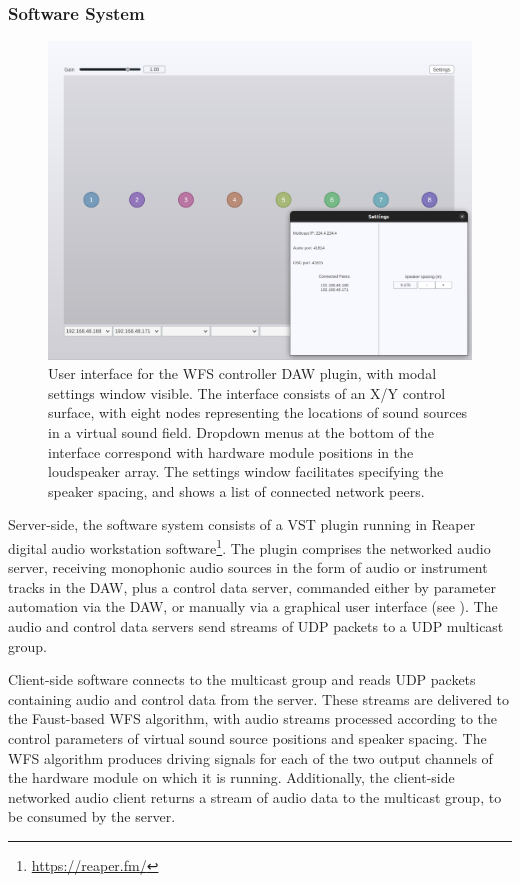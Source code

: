 \subsubsection{Software System}\label{subsubsec:software-system}

\begin{figure}[ht]
    \centering
    \includegraphics[width=\textwidth]{figures/plugin}
    \caption{
        User interface for the WFS controller DAW plugin, with modal
        settings window visible.
        The interface consists of an X/Y control surface, with eight nodes
        representing the locations of sound sources in a virtual sound field.
        Dropdown menus at the bottom of the interface correspond with hardware
        module positions in the loudspeaker array.
        The settings window facilitates specifying the speaker spacing, and
        shows a list of connected network peers.
    }
    \label{fig:plugin-interface}
\end{figure}

Server-side, the software system consists of a VST plugin running in Reaper
digital audio workstation software\footnote{\url{https://reaper.fm/}}.
The plugin comprises the networked audio server, receiving monophonic audio
sources in the form of audio or instrument tracks in the DAW, plus a control
data server, commanded either by parameter automation via the DAW, or manually
via a graphical user interface (see ).
The audio and control data servers send streams of UDP packets to a UDP
multicast group.

Client-side software connects to the multicast group and reads UDP packets
containing audio and control data from the server.
These streams are delivered to the Faust-based WFS algorithm, with audio
streams processed according to the control parameters of virtual sound source
positions and speaker spacing.
The WFS algorithm produces driving signals for each of the two output channels
of the hardware module on which it is running.
Additionally, the client-side networked audio client returns a stream of audio
data to the multicast group, to be consumed by the server.

